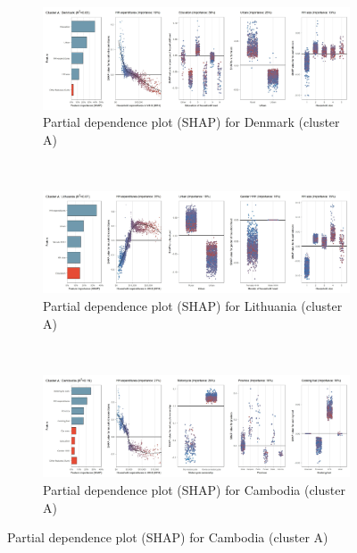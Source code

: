 \begin{figure}[ht!]\ContinuedFloat
    \centering
   \begin{subfigure}[b]{\textwidth}
         \centering
         \caption{Partial dependence plot (SHAP) for Denmark (cluster A)}
         \label{fig:5b_DNK}
         \includegraphics[width=\textwidth]{Figure 5b/Figure_5b_DNK}         
     \end{subfigure}
    \\
    \vspace{0.5cm}
   \begin{subfigure}[b]{\textwidth}
         \centering
         \caption{Partial dependence plot (SHAP) for Lithuania (cluster A)}
         \label{fig:5b_LTU}
         \includegraphics[width=\textwidth]{Figure 5b/Figure_5b_LTU}         
     \end{subfigure}
    \\
    \vspace{0.5cm}
   \begin{subfigure}[b]{\textwidth}
         \centering
         \caption{Partial dependence plot (SHAP) for Cambodia (cluster A)}
         \label{fig:5b_KHM}
         \includegraphics[width=\textwidth]{Figure 5b/Figure_5b_KHM}

\end{subfigure}
\end{figure}
